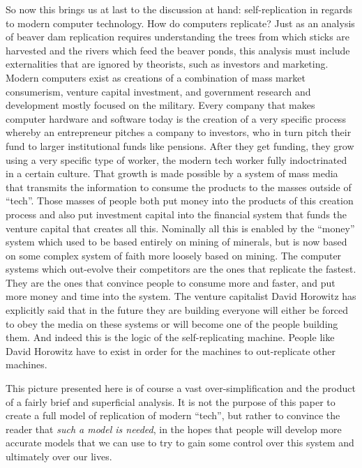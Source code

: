 So now this brings us at last to the discussion at hand:
self-replication in regards to modern computer technology. How do
computers replicate? Just as an analysis of beaver dam replication
requires understanding the trees from which sticks are harvested and the
rivers which feed the beaver ponds, this analysis must include
externalities that are ignored by theorists, such as investors and
marketing. Modern computers exist as creations of a combination of mass
market consumerism, venture capital investment, and government research
and development mostly focused on the military. Every company that makes
computer hardware and software today is the creation of a very specific
process whereby an entrepreneur pitches a company to investors, who in
turn pitch their fund to larger institutional funds like pensions. After
they get funding, they grow using a very specific type of worker, the
modern tech worker fully indoctrinated in a certain culture. That growth
is made possible by a system of mass media that transmits the
information to consume the products to the masses outside of ``tech''.
Those masses of people both put money into the products of this creation
process and also put investment capital into the financial system that
funds the venture capital that creates all this. Nominally all this is
enabled by the ``money'' system which used to be based entirely on
mining of minerals, but is now based on some complex system of faith
more loosely based on mining. The computer systems which out-evolve
their competitors are the ones that replicate the fastest. They are the
ones that convince people to consume more and faster, and put more money
and time into the system. The venture capitalist David Horowitz has
explicitly said that in the future they are building everyone will
either be forced to obey the media on these systems or will become one
of the people building them. And indeed this is the logic of the
self-replicating machine. People like David Horowitz have to exist in
order for the machines to out-replicate other machines.

This picture presented here is of course a vast over-simplification and
the product of a fairly brief and superficial analysis. It is not the
purpose of this paper to create a full model of replication of modern
``tech'', but rather to convince the reader that \emph{such a model is
needed}, in the hopes that people will develop more accurate models that
we can use to try to gain some control over this system and ultimately
over our lives.

